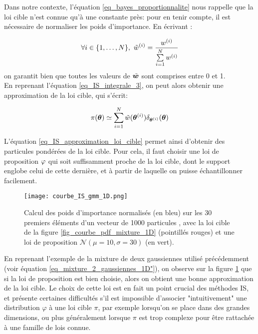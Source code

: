  Dans notre contexte, l'équation \eqref{eq_bayes_proportionnalite} nous rappelle que la loi cible n'est connue qu'à une constante près: pour en tenir compte, il est nécessaire de normaliser les poids d'importance. En écrivant : 
 
 \begin{equation}
 \forall i \in \{1, \dots, N\}, ~ {\tilde{w}}^{(i)} = \dfrac{w^{(i)}}{\sum\limits_{i=1}^N w^{(i)}}
 \label{eq_IS_poids_normalises}
 \end{equation}
 on garantit bien que toutes les valeurs de ${\tilde{\bm{w}}}$ sont comprises entre 0 et 1. \\
 
 En reprenant l'équation \eqref{eq_IS_integrale_3}, on peut alors obtenir une approximation de la loi cible, qui s'écrit:
 
 \begin{equation}
 \pi({\bm{\theta}}) \simeq \sum\limits_{i=1}^N {\tilde{w}}({\bm{\theta}}^{(i)})\delta_{{\bm{\theta}}^{(i)}}({\bm{\theta}})
 \label{eq_IS_approximation_loi_cible}
 \end{equation}

L'équation \eqref{eq_IS_approximation_loi_cible} permet ainsi d'obtenir des particules pondérées de la loi cible. Pour cela, il faut choisir une loi de proposition ${\varphi}$ qui soit suffisamment proche de la loi cible, dont le support englobe celui de cette dernière, et à partir de laquelle on puisse échantillonner facilement. \\

\begin{figure}[h!]
	\centering
	\texttt{[image: courbe\_IS\_gmm\_1D.png]}
	\caption{Calcul des poids d'importance normalisés  (en bleu) sur les 30 premiers éléments d'un vecteur de 1000 particules , avec la loi cible de la figure \ref{fig_courbe_pdf_mixture_1D} (pointillés rouges) et une loi de proposition $\mathcal{N}(\mu = 10, \sigma = 30)$ (en vert).  }
	\label{fig_IS_gmm_1D}
\end{figure}

En reprenant l'exemple de la mixture de deux gaussiennes utilisé précédemment (voir équation  \eqref{eq_mixture_2_gaussiennes_1D"}), on observe sur la figure \ref{fig_IS_gmm_1D} que si la loi de proposition est bien choisie, alors on obtient une bonne approximation de la loi cible. Le choix de cette loi est en fait un point crucial des méthodes IS, et présente certaines difficultés s'il est impossible d'associer "intuitivement" une distribution $\varphi$ à une loi cible $\pi$, par exemple lorsqu'on se place dans des grandes dimensions, ou plus généralement lorsque $\pi$ est trop complexe pour être rattachée à une famille de lois connue. 

